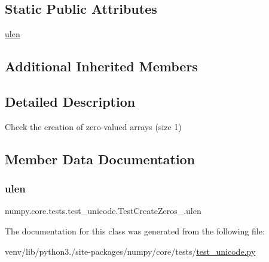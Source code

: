 \subsection*{Static Public Attributes}
\begin{DoxyCompactItemize}
\item 
\hyperlink{classnumpy_1_1core_1_1tests_1_1test__unicode_1_1TestCreateZeros__1_a96b1b4af6140ee7f36be4034dd7563ac}{ulen}
\end{DoxyCompactItemize}
\subsection*{Additional Inherited Members}


\subsection{Detailed Description}
\begin{DoxyVerb}Check the creation of zero-valued arrays (size 1)\end{DoxyVerb}
 

\subsection{Member Data Documentation}
\mbox{\label{classnumpy_1_1core_1_1tests_1_1test__unicode_1_1TestCreateZeros__1_a96b1b4af6140ee7f36be4034dd7563ac}} 
\subsubsection{\texorpdfstring{ulen}{ulen}}
{\footnotesize\ttfamily numpy.\+core.\+tests.\+test\+\_\+unicode.\+Test\+Create\+Zeros\+\_.\+ulen\hspace{0.3cm}{\ttfamily [static]}}



The documentation for this class was generated from the following file\+:\begin{DoxyCompactItemize}
\item 
venv/lib/python3./site-\/packages/numpy/core/tests/\hyperlink{test__unicode_8py}{test\+\_\+unicode.\+py}\end{DoxyCompactItemize}
